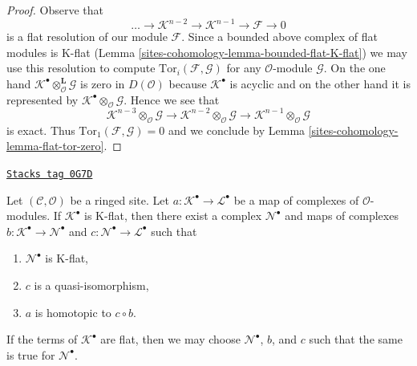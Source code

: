 \begin{proof}
Observe that
$$
\ldots \to \mathcal{K}^{n - 2} \to \mathcal{K}^{n - 1} \to
\mathcal{F} \to 0
$$
is a flat resolution of our module $\mathcal{F}$. Since a bounded above complex
of flat modules is K-flat (Lemma \ref{sites-cohomology-lemma-bounded-flat-K-flat})
we may use this resolution to compute
$\text{Tor}_i(\mathcal{F}, \mathcal{G})$ for any
$\mathcal{O}$-module $\mathcal{G}$. On the one hand
$\mathcal{K}^\bullet \otimes_\mathcal{O}^\mathbf{L} \mathcal{G}$
is zero in $D(\mathcal{O})$ because $\mathcal{K}^\bullet$ is acyclic
and on the other hand it is represented by
$\mathcal{K}^\bullet \otimes_\mathcal{O} \mathcal{G}$.
Hence we see that
$$
\mathcal{K}^{n - 3} \otimes_\mathcal{O} \mathcal{G} \to
\mathcal{K}^{n - 2} \otimes_\mathcal{O} \mathcal{G} \to
\mathcal{K}^{n - 1} \otimes_\mathcal{O} \mathcal{G}
$$
is exact. Thus $\text{Tor}_1(\mathcal{F}, \mathcal{G}) = 0$
and we conclude by Lemma \ref{sites-cohomology-lemma-flat-tor-zero}.
\end{proof}

\begin{lemma}
\label{sites-cohomology-lemma-factor-through-K-flat}
\href{https://stacks.math.columbia.edu/tag/0G7D}{\texttt{Stacks tag 0G7D}}

Let $(\mathcal{C}, \mathcal{O})$ be a ringed site.
Let $a : \mathcal{K}^\bullet \to \mathcal{L}^\bullet$ be a map of complexes
of $\mathcal{O}$-modules. If $\mathcal{K}^\bullet$ is K-flat, then
there exist a complex $\mathcal{N}^\bullet$ and maps of complexes
$b : \mathcal{K}^\bullet \to \mathcal{N}^\bullet$
and $c : \mathcal{N}^\bullet \to \mathcal{L}^\bullet$ such that
\begin{enumerate}
\item $\mathcal{N}^\bullet$ is K-flat,
\item $c$ is a quasi-isomorphism,
\item $a$ is homotopic to $c \circ b$.
\end{enumerate}
If the terms of $\mathcal{K}^\bullet$ are flat, then we may choose
$\mathcal{N}^\bullet$, $b$, and $c$
such that the same is true for $\mathcal{N}^\bullet$.
\end{lemma}

